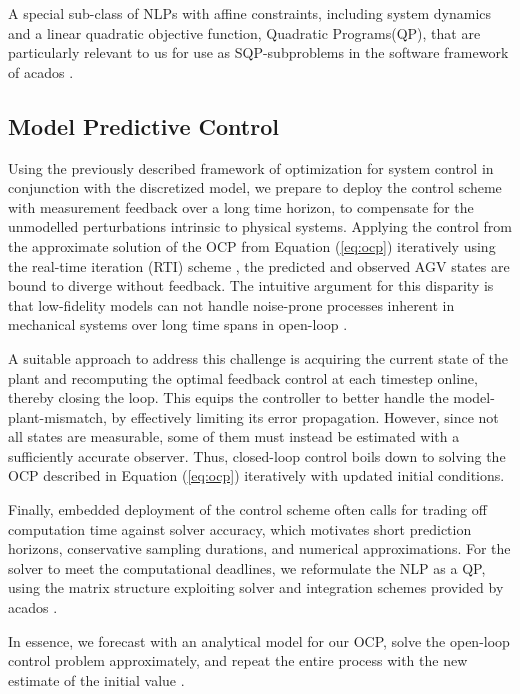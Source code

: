 \par A special sub-class of \ac{NLP}s with affine constraints, including system dynamics and a linear quadratic objective function, Quadratic Programs(QP), that are particularly relevant to us for use as \ac{SQP}-subproblems in the software framework of acados \cite[p. 40]{gros_numerical_2022}.

\subsection{Model Predictive Control}

Using the previously described framework of optimization for system control in conjunction with the discretized model, we prepare to deploy the control scheme with measurement feedback over a long time horizon, to compensate for the unmodelled perturbations intrinsic to physical systems. Applying the control from the approximate solution of the \ac{OCP} from Equation (\ref{eq:ocp}) iteratively using the real-time iteration (RTI) scheme \cite{gros_linear_2020}, the predicted and observed \ac{AGV} states are bound to diverge without feedback. The intuitive argument for this disparity is that low-fidelity models can not handle noise-prone processes inherent in mechanical systems over long time spans in open-loop \cite[Ch. 15]{gros_numerical_2022}.

\par A suitable approach to address this challenge is acquiring the current state of the plant and recomputing the optimal feedback control at each timestep online, thereby closing the loop. This equips the controller to better handle the model-plant-mismatch, by effectively limiting its error propagation. However, since not all states are measurable, some of them must instead be estimated with a sufficiently accurate observer. Thus, closed-loop control boils down to solving the \ac{OCP} described in Equation (\ref{eq:ocp}) iteratively with updated initial conditions.

\par Finally, embedded deployment of the control scheme often calls for trading off computation time against solver accuracy, which motivates short prediction horizons, conservative sampling durations, and numerical approximations. For the solver to meet the computational deadlines, we reformulate the \ac{NLP} as a QP, using the matrix structure exploiting solver and integration schemes provided by acados \cite{gros_linear_2020}.
\par In essence, we forecast with an analytical model for our \ac{OCP}, solve the open-loop control problem approximately, and repeat the entire process with the new estimate of the initial value \cite[p. 283]{gros_numerical_2022}.

